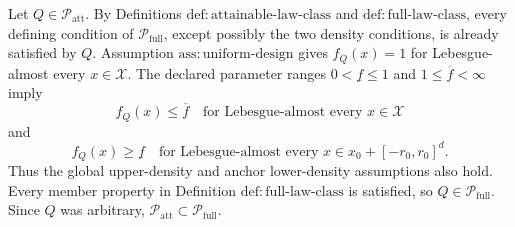 Let \(Q\in\mathcal P_{\mathrm{att}}\).  By Definitions \(\mathrm{def{:}attainable\text{-}law\text{-}class}\) and \(\mathrm{def{:}full\text{-}law\text{-}class}\), every defining condition of \(\mathcal P_{\mathrm{full}}\), except possibly the two density conditions, is already satisfied by \(Q\).  Assumption \(\mathrm{ass{:}uniform\text{-}design}\) gives \(f_Q(x)=1\) for Lebesgue-almost every \(x\in\mathcal X\).  The declared parameter ranges \(0<\underline f\le1\) and \(1\le\overline f<\infty\) imply
\[
 f_Q(x)\le\overline f\quad\text{for Lebesgue-almost every }x\in\mathcal X
\]
and
\[
 f_Q(x)\ge\underline f\quad\text{for Lebesgue-almost every }
 x\in x_0+[-r_0,r_0]^d.
\]
Thus the global upper-density and anchor lower-density assumptions also hold.  Every member property in Definition \(\mathrm{def{:}full\text{-}law\text{-}class}\) is satisfied, so \(Q\in\mathcal P_{\mathrm{full}}\).  Since \(Q\) was arbitrary, \(\mathcal P_{\mathrm{att}}\subset\mathcal P_{\mathrm{full}}\).
